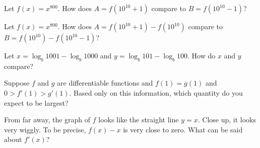 \documentclass{ximera}
\newcommand{\recommendation}[1]{}
\begin{document}
\begin{shuffle}
\begin{problem}
  Let $f(x) = x^{800}$.  How does $A = f(10^{10} + 1)$ compare to $B = f(10^{10} - 1)$?
  \begin{multipleChoice}
  \end{multipleChoice}
\end{problem}

\begin{problem}
  Let $f(x) = x^{800}$.  How does $A = f(10^{10} + 1) - f(10^{10})$ compare to $B = f(10^{10}) - f(10^{10} - 1)$?
  \begin{multipleChoice}
  \end{multipleChoice}
\end{problem}

\begin{problem}
  Let $x = \log_b 1001 - \log_b 1000$ and $y = \log_b 101 - \log_b 100$.  How do $x$ and $y$ compare?
  \begin{multipleChoice}
  \end{multipleChoice}
\end{problem}

\begin{problem}
  Suppose $f$ and $g$ are differentiable functions and $f(1) = g(1)$ and 
  $0 > f'(1) > g'(1)$.  Based only on this information, which quantity
  do you expect to be largest?
  \begin{multipleChoice}
  \end{multipleChoice}
\end{problem}



\begin{problem}
  From far away, the graph of $f$ looks like the straight line
  $y = x$.  Close up, it looks very wiggly.  To be precise, $f(x) - x$
  is very close to zero.  What can be said about $f'(x)$?
  \begin{multipleChoice}
  \end{multipleChoice}
\end{problem}


\end{shuffle}
\end{document}
